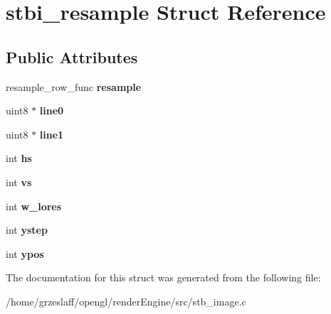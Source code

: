 \hypertarget{structstbi__resample}{\section{stbi\-\_\-resample Struct Reference}
\label{structstbi__resample}
}
\subsection*{Public Attributes}
\begin{DoxyCompactItemize}
\item 
\hypertarget{structstbi__resample_a94091463ebc5933cdaf7a813025b6e19}{resample\-\_\-row\-\_\-func {\bfseries resample}}\label{structstbi__resample_a94091463ebc5933cdaf7a813025b6e19}

\item 
\hypertarget{structstbi__resample_a30c51395efffb663b183d7c64def6db3}{uint8 $\ast$ {\bfseries line0}}\label{structstbi__resample_a30c51395efffb663b183d7c64def6db3}

\item 
\hypertarget{structstbi__resample_ac1165a6da3cf652b951056667f89b1f2}{uint8 $\ast$ {\bfseries line1}}\label{structstbi__resample_ac1165a6da3cf652b951056667f89b1f2}

\item 
\hypertarget{structstbi__resample_a1513390ba0102364169a52ff26d5e0f2}{int {\bfseries hs}}\label{structstbi__resample_a1513390ba0102364169a52ff26d5e0f2}

\item 
\hypertarget{structstbi__resample_a331c717f53239339c0c678f92a7bf4d5}{int {\bfseries vs}}\label{structstbi__resample_a331c717f53239339c0c678f92a7bf4d5}

\item 
\hypertarget{structstbi__resample_a41d43c7b0d6caafbf0dfa8ef064bd2a2}{int {\bfseries w\-\_\-lores}}\label{structstbi__resample_a41d43c7b0d6caafbf0dfa8ef064bd2a2}

\item 
\hypertarget{structstbi__resample_a0c479143447d103e73348c89f8b4ef1c}{int {\bfseries ystep}}\label{structstbi__resample_a0c479143447d103e73348c89f8b4ef1c}

\item 
\hypertarget{structstbi__resample_aa1f1ad33e739f7a38fbad8752f64f983}{int {\bfseries ypos}}\label{structstbi__resample_aa1f1ad33e739f7a38fbad8752f64f983}

\end{DoxyCompactItemize}


The documentation for this struct was generated from the following file\-:\begin{DoxyCompactItemize}
\item 
/home/grzeslaff/opengl/render\-Engine/src/stb\-\_\-image.\-c\end{DoxyCompactItemize}
